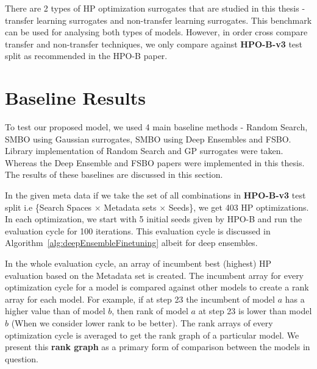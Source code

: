 \documentclass[12pt, twoside, ngerman]{report}
\begin{document}
There are 2 types of HP optimization surrogates that are studied in this thesis - transfer learning surrogates
and non-transfer learning surrogates.
This benchmark can be used for analysing both types of models.
However,  in order cross compare transfer and non-transfer techniques,  we only compare against \textbf{HPO-B-v3} test split as recommended in the HPO-B paper.

\section{Baseline Results}

To test our proposed model,  we used 4 main baseline methods - Random Search,  SMBO using Gaussian surrogates,  SMBO using Deep Ensembles and FSBO.
Library implementation of Random Search and GP surrogates were taken.
Whereas the Deep Ensemble and FSBO papers were implemented in this thesis.
The results of these baselines are discussed in this section.

In the given meta data if we take the set of all combinations in \textbf{HPO-B-v3} test split i.e \{Search Spaces $\times$ Metadata sets $\times$ Seeds\},  we get 403 HP optimizations.
In each optimization,  we start with 5 initial seeds given by HPO-B and run the evaluation cycle for 100 iterations.
This evaluation cycle is discussed in Algorithm~\ref{alg:deepEnsembleFinetuning} albeit for deep ensembles.

In the whole evaluation cycle,  an array of incumbent best (highest) HP evaluation based on the Metadata set is created.
The incumbent array for every optimization cycle for a model is compared against other models to create a rank array for each model.
For example,  if at step 23 the incumbent of model $a$ has a higher value than of model $b$,  then rank of model $a$ at step 23 is lower than model $b$ (When we consider lower rank to be better).
The rank arrays of every optimization cycle is averaged to get the rank graph of a particular model.
We present this \textbf{rank graph} as a primary form of comparison between the models in question.
\end{document}
